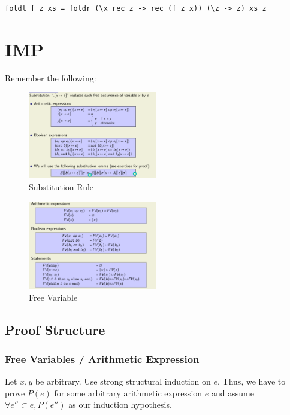 \documentclass{article}
\begin{document}
\begin{lstlisting}[style=haskellstyle, caption=Haskell Code, label=code:haskell]
    foldl f z xs = foldr (\x rec z -> rec (f z x)) (\z -> z) xs z
\end{lstlisting}

\section{IMP}

Remember the following:

\begin{figure}[ht]
    \centering
    \includegraphics[width=0.5\textwidth]{assets/substitution-rule.png}
    \caption{Substitution Rule}
\end{figure}

\begin{figure}[ht]
    \centering
    \includegraphics[width=0.5\textwidth]{assets/free-variable.png}
    \caption{Free Variable}
\end{figure}

\subsection{Proof Structure}

\subsubsection{Free Variables / Arithmetic Expression}

Let $x, y$ be arbitrary. Use strong structural induction on $e$. Thus, we have to prove $P(e)$ for some arbitrary arithmetic expression $e$ and assume $\forall e'' \subset e, P(e'')$ as our induction hypothesis.
\end{document}

